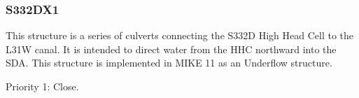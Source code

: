 
%
%


\clearpage

\subsubsection{S332DX1}
This structure is a series of culverts connecting the S332D High Head Cell to the L31W canal. It is intended to direct water from the HHC northward into the SDA. This structure is implemented in MIKE 11 as an Underflow structure.

\begin{packed_items}
\item Priority 1: Close.
\end{packed_items}

